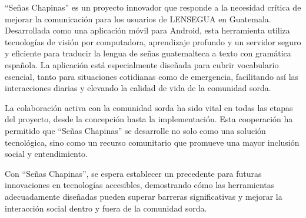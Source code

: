 ``Señas Chapinas'' es un proyecto innovador que responde a la necesidad crítica de mejorar la comunicación para los usuarios de LENSEGUA en Guatemala. Desarrollada como una aplicación móvil para Android, esta herramienta utiliza tecnologías de visión por computadora, aprendizaje profundo y un servidor seguro y eficiente para traducir la lengua de señas guatemalteca a texto con gramática española. La aplicación está especialmente diseñada para cubrir vocabulario esencial, tanto para situaciones cotidianas como de emergencia, facilitando así las interacciones diarias y elevando la calidad de vida de la comunidad sorda.

La colaboración activa con la comunidad sorda ha sido vital en todas las etapas del proyecto, desde la concepción hasta la implementación. Esta cooperación ha permitido que ``Señas Chapinas'' se desarrolle no solo como una solución tecnológica, sino como un recurso comunitario que promueve una mayor inclusión social y entendimiento.

Con ``Señas Chapinas'', se espera establecer un precedente para futuras innovaciones en tecnologías accesibles, demostrando cómo las herramientas adecuadamente diseñadas pueden superar barreras significativas y mejorar la interacción social dentro y fuera de la comunidad sorda.
